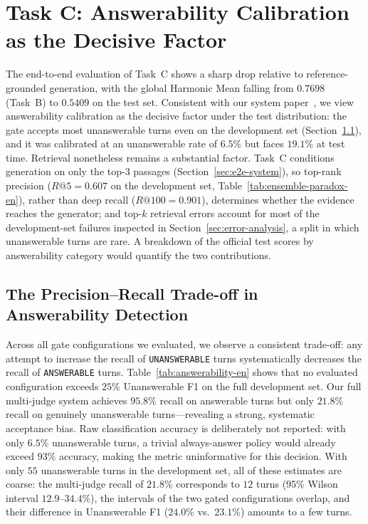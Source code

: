 \section{Task C: Answerability Calibration as the Decisive Factor}
\label{sec:taskC-bottleneck}

The end-to-end evaluation of Task~C shows a sharp drop relative to reference-grounded generation, with the global Harmonic Mean falling from $0.7698$ (Task~B) to $0.5409$ on the test set. Consistent with our system paper~\citep{athanasiou2026ailsntua}, we view answerability calibration as the decisive factor under the test distribution: the gate accepts most unanswerable turns even on the development set (Section~\ref{sec:pr-tradeoff}), and it was calibrated at an unanswerable rate of $6.5\%$ but faces $19.1\%$ at test time. Retrieval nonetheless remains a substantial factor. Task~C conditions generation on only the top-$3$ passages (Section~\ref{sec:e2e-system}), so top-rank precision ($R@5{=}0.607$ on the development set, Table~\ref{tab:ensemble-paradox-en}), rather than deep recall ($R@100{=}0.901$), determines whether the evidence reaches the generator; and top-$k$ retrieval errors account for most of the development-set failures inspected in Section~\ref{sec:error-analysis}, a split in which unanswerable turns are rare. A breakdown of the official test scores by answerability category would quantify the two contributions.

\subsection{The Precision--Recall Trade-off in Answerability Detection}
\label{sec:pr-tradeoff}

Across all gate configurations we evaluated, we observe a consistent trade-off: any attempt to increase the recall of \texttt{UNANSWERABLE} turns systematically decreases the recall of \texttt{ANSWERABLE} turns. Table~\ref{tab:answerability-en} shows that no evaluated configuration exceeds $25\%$ Unanswerable F1 on the full development set. Our full multi-judge system achieves $95.8\%$ recall on answerable turns but only $21.8\%$ recall on genuinely unanswerable turns---revealing a strong, systematic acceptance bias. Raw classification accuracy is deliberately not reported: with only $6.5\%$ unanswerable turns, a trivial always-answer policy would already exceed $93\%$ accuracy, making the metric uninformative for this decision. With only $55$ unanswerable turns in the development set, all of these estimates are coarse: the multi-judge recall of $21.8\%$ corresponds to $12$ turns (95\% Wilson interval $12.9$--$34.4\%$), the intervals of the two gated configurations overlap, and their difference in Unanswerable F1 ($24.0\%$ vs.\ $23.1\%$) amounts to a few turns.

